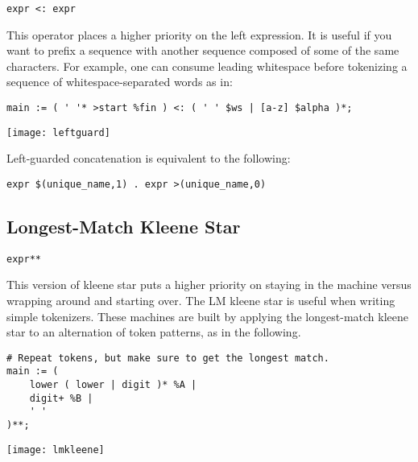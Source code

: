 \documentclass[letterpaper,11pt,oneside]{book}
\newcommand{\verbspace}{\vspace{10pt}}
\newcommand{\graphspace}{\vspace{10pt}}
\newenvironment{inline_code}{\def\baselinestretch{1}\vspace{12pt}\small}{}
\begin{document}
\verb|expr <: expr| 

This operator places
a higher priority on the left expression. It is useful if you want to prefix a
sequence with another sequence composed of some of the same characters. For
example, one can consume leading whitespace before tokenizing a sequence of
whitespace-separated words as in:

\begin{inline_code}
\begin{verbatim}
main := ( ' '* >start %fin ) <: ( ' ' $ws | [a-z] $alpha )*;
\end{verbatim}
\end{inline_code}
\verbspace
% }%%
% END GENERATE

\graphspace
\begin{center}
\texttt{[image: leftguard]}
\end{center}
\graphspace

Left-guarded concatenation is equivalent to the following:

\begin{verbatim}
expr $(unique_name,1) . expr >(unique_name,0)
\end{verbatim}
\verbspace

\subsection{Longest-Match Kleene Star}
\label{longest_match_kleene_star}

\verb|expr**| 

This version of kleene star puts a higher priority on staying in the
machine versus wrapping around and starting over. The LM kleene star is useful
when writing simple tokenizers.  These machines are built by applying the
longest-match kleene star to an alternation of token patterns, as in the
following.

\begin{inline_code}
\begin{verbatim}
# Repeat tokens, but make sure to get the longest match.
main := (
    lower ( lower | digit )* %A | 
    digit+ %B | 
    ' '
)**;
\end{verbatim}
\end{inline_code}
\verbspace
% }%%
% END GENERATE

\graphspace
\begin{center}
\texttt{[image: lmkleene]}
\end{center}
\graphspace
\end{document}
